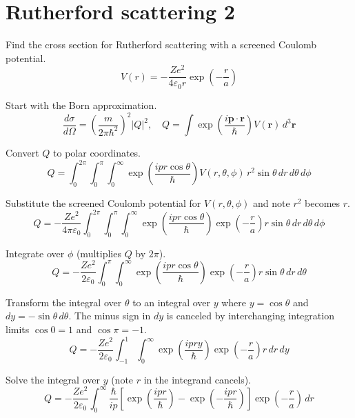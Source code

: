 

\section*{Rutherford scattering 2}

Find the cross section for Rutherford scattering with a screened Coulomb potential.
\begin{equation*}
V(r)=-\frac{Ze^2}{4\varepsilon_0r}\exp\left(-\frac{r}{a}\right)
\end{equation*}

Start with the Born approximation.
\begin{equation*}
\frac{d\sigma}{d\Omega}=
\left(\frac{m}{2\pi\hbar^2}\right)^2|Q|^2,\quad
Q=\int\exp\left(\frac{i\mathbf p\cdot\mathbf r}{\hbar}\right)V(\mathbf r)\,d^3\mathbf r
\end{equation*}

Convert $Q$ to polar coordinates.
\begin{equation*}
Q=\int_0^{2\pi}
\int_0^\pi
\int_0^\infty
\exp\left(\frac{ipr\cos\theta}{\hbar}\right)V(r,\theta,\phi)
\,r^2\sin\theta\,dr\,d\theta\,d\phi
\end{equation*}

Substitute the screened Coulomb potential for $V(r,\theta,\phi)$ and note $r^2$ becomes $r$.
\begin{equation*}
Q=-\frac{Ze^2}{4\pi\varepsilon_0}
\int_0^{2\pi}
\int_0^\pi
\int_0^\infty
\exp\left(\frac{ipr\cos\theta}{\hbar}\right)
\exp\left(-\frac{r}{a}\right)
r\sin\theta\,dr\,d\theta\,d\phi
\end{equation*}

Integrate over $\phi$ (multiplies $Q$ by $2\pi$).
\begin{equation*}
Q=-\frac{Ze^2}{2\varepsilon_0}
\int_0^\pi
\int_0^\infty
\exp\left(\frac{ipr\cos\theta}{\hbar}\right)
\exp\left(-\frac{r}{a}\right)
r\sin\theta\,dr\,d\theta
\end{equation*}

Transform the integral over $\theta$ to an integral over $y$
where $y=\cos\theta$ and $dy=-\sin\theta\,d\theta$.
The minus sign in $dy$ is canceled by interchanging integration limits
$\cos0=1$ and $\cos\pi=-1$.
\begin{equation*}
Q=-\frac{Ze^2}{2\varepsilon_0}
\int_{-1}^1
\int_0^\infty
\exp\left(\frac{ipry}{\hbar}\right)
\exp\left(-\frac{r}{a}\right)
r\,dr\,dy
\end{equation*}

Solve the integral over $y$ (note $r$ in the integrand cancels).
\begin{equation*}
Q=-\frac{Ze^2}{2\varepsilon_0}
\int_0^\infty
\frac{\hbar}{ip}
\left[\exp\left(\frac{ipr}{\hbar}\right)-\exp\left(-\frac{ipr}{\hbar}\right)\right]
\exp\left(-\frac{r}{a}\right)
\,dr
\end{equation*}

